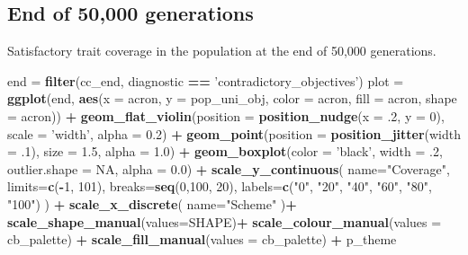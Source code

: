 \documentclass[]{book}
\newenvironment{Shaded}{\begin{snugshade}}{\end{snugshade}}
\newcommand{\DataTypeTok}[1]{\textcolor[rgb]{0.13,0.29,0.53}{#1}}
\newcommand{\DecValTok}[1]{\textcolor[rgb]{0.00,0.00,0.81}{#1}}
\newcommand{\FloatTok}[1]{\textcolor[rgb]{0.00,0.00,0.81}{#1}}
\newcommand{\KeywordTok}[1]{\textcolor[rgb]{0.13,0.29,0.53}{\textbf{#1}}}
\newcommand{\NormalTok}[1]{#1}
\newcommand{\OperatorTok}[1]{\textcolor[rgb]{0.81,0.36,0.00}{\textbf{#1}}}
\newcommand{\OtherTok}[1]{\textcolor[rgb]{0.56,0.35,0.01}{#1}}
\newcommand{\StringTok}[1]{\textcolor[rgb]{0.31,0.60,0.02}{#1}}
\begin{document}
\hypertarget{end-of-50000-generations-1}{%
\subsection{End of 50,000 generations}\label{end-of-50000-generations-1}}

Satisfactory trait coverage in the population at the end of 50,000 generations.

\begin{Shaded}
\begin{Highlighting}[]
\NormalTok{end =}\StringTok{ }\KeywordTok{filter}\NormalTok{(cc_end, diagnostic }\OperatorTok{==}\StringTok{ 'contradictory_objectives'}\NormalTok{)}
\NormalTok{plot =}\StringTok{ }\KeywordTok{ggplot}\NormalTok{(end, }\KeywordTok{aes}\NormalTok{(}\DataTypeTok{x =}\NormalTok{ acron, }\DataTypeTok{y =}\NormalTok{ pop_uni_obj, }\DataTypeTok{color =}\NormalTok{ acron, }\DataTypeTok{fill =}\NormalTok{ acron, }\DataTypeTok{shape =}\NormalTok{ acron)) }\OperatorTok{+}
\StringTok{  }\KeywordTok{geom_flat_violin}\NormalTok{(}\DataTypeTok{position =} \KeywordTok{position_nudge}\NormalTok{(}\DataTypeTok{x =} \FloatTok{.2}\NormalTok{, }\DataTypeTok{y =} \DecValTok{0}\NormalTok{), }\DataTypeTok{scale =} \StringTok{'width'}\NormalTok{, }\DataTypeTok{alpha =} \FloatTok{0.2}\NormalTok{) }\OperatorTok{+}
\StringTok{  }\KeywordTok{geom_point}\NormalTok{(}\DataTypeTok{position =} \KeywordTok{position_jitter}\NormalTok{(}\DataTypeTok{width =} \FloatTok{.1}\NormalTok{), }\DataTypeTok{size =} \FloatTok{1.5}\NormalTok{, }\DataTypeTok{alpha =} \FloatTok{1.0}\NormalTok{) }\OperatorTok{+}
\StringTok{  }\KeywordTok{geom_boxplot}\NormalTok{(}\DataTypeTok{color =} \StringTok{'black'}\NormalTok{, }\DataTypeTok{width =} \FloatTok{.2}\NormalTok{, }\DataTypeTok{outlier.shape =} \OtherTok{NA}\NormalTok{, }\DataTypeTok{alpha =} \FloatTok{0.0}\NormalTok{) }\OperatorTok{+}
\StringTok{  }\KeywordTok{scale_y_continuous}\NormalTok{(}
    \DataTypeTok{name=}\StringTok{"Coverage"}\NormalTok{,}
    \DataTypeTok{limits=}\KeywordTok{c}\NormalTok{(}\OperatorTok{-}\DecValTok{1}\NormalTok{, }\DecValTok{101}\NormalTok{),}
    \DataTypeTok{breaks=}\KeywordTok{seq}\NormalTok{(}\DecValTok{0}\NormalTok{,}\DecValTok{100}\NormalTok{, }\DecValTok{20}\NormalTok{),}
    \DataTypeTok{labels=}\KeywordTok{c}\NormalTok{(}\StringTok{"0"}\NormalTok{, }\StringTok{"20"}\NormalTok{, }\StringTok{"40"}\NormalTok{, }\StringTok{"60"}\NormalTok{, }\StringTok{"80"}\NormalTok{, }\StringTok{"100"}\NormalTok{)}
\NormalTok{  ) }\OperatorTok{+}
\StringTok{  }\KeywordTok{scale_x_discrete}\NormalTok{(}
    \DataTypeTok{name=}\StringTok{"Scheme"}
\NormalTok{  )}\OperatorTok{+}
\StringTok{  }\KeywordTok{scale_shape_manual}\NormalTok{(}\DataTypeTok{values=}\NormalTok{SHAPE)}\OperatorTok{+}
\StringTok{  }\KeywordTok{scale_colour_manual}\NormalTok{(}\DataTypeTok{values =}\NormalTok{ cb_palette) }\OperatorTok{+}
\StringTok{  }\KeywordTok{scale_fill_manual}\NormalTok{(}\DataTypeTok{values =}\NormalTok{ cb_palette) }\OperatorTok{+}
\StringTok{  }\NormalTok{p_theme}


\end{Highlighting}
\end{Shaded}
\end{document}
